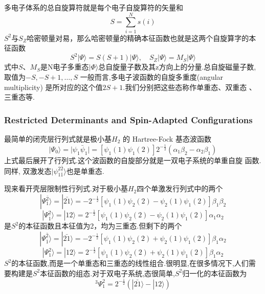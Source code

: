 \documentclass[fontset=none,12pt,a4paper]{ctexart}
\numberwithin{equation}{section}
\begin{document}
多电子体系的总自旋算符就是每个电子自旋算符的矢量和
\begin{equation}
  S=\sum_{i=1}^N s(i)
\end{equation}
$S^2$与$S_Z$哈密顿量对易，那么哈密顿量的精确本征函数也就是这两个自旋算字的本征函数
\begin{equation}
  S^2|\Psi\rangle=S(S+1)|\Psi\rangle
  ,\quad S_Z|\Psi\rangle=M_S|\Psi\rangle
\end{equation}
式中$S$、$M_S$是N电子多重态$|\Phi\rangle$总自旋量子数及其z方向上的分量.总自旋磁量子数,取值为$-S,-S+1,\dots,S$
一般而言,多电子波函数的自旋多重度(angular multiplicity) 是所对应的这个值$2S+1$.我们分别把这些态称作单重态、双重态
、三重态等.
\subsubsection{Restricted Determinants and Spin-Adapted Configurations}
最简单的闭壳层行列式就是极小基$H_2$ 的 Hartree-Fock 基态波函数
\begin{equation}
  |\Psi_0\rangle=|\psi_1\bar{\psi}_1|=[\psi_1(1)\psi_1(2)]2^{-\frac{1}{2}}(\alpha_1\beta_2-\alpha_2\beta_1)
\end{equation}
上式最后展开了行列式.这个波函数的自旋部分就是一双电子系统的单重自旋 函数. 同样, 双激发态$|\psi_{1\bar{1}}^{2\bar{2}}\rangle$也是单重态.

现来看开壳层限制性行列式.对于极小基$H_2$四个单激发行列式中的两个
\begin{equation}
  | \Psi_{1}^{\bar{2}} \rangle
  =|\bar{21}\rangle=-2^{-\frac{1}{2}}[\psi_1(1)\psi_2(2)-\psi_2(1)\psi_1(2)]\beta_1\beta_2
\end{equation}
\begin{equation}
  | \Psi_{\bar{1}}^{2} \rangle
  =|12\rangle=2^{-\frac{1}{2}}[\psi_1(1)\psi_2(2)-\psi_2(1)\psi_1(2)]\alpha_1\alpha_2
\end{equation}
是$S^2$的本征函数且本征值为2，均为三重态.但剩下的两个
\begin{equation}
  | \Psi_{\bar{1}}^{\bar{2}} \rangle
  =|\bar{21}\rangle=-2^{-\frac{1}{2}}[\psi_1(1)\psi_2(2)+\psi_2(1)\psi_1(2)]\beta_1\alpha_2
\end{equation}
\begin{equation}
  | \Psi_1^{2} \rangle
  =|12\rangle=2^{-\frac{1}{2}}[\psi_1(1)\psi_2(2)+\psi_2(1)\psi_1(2)]\beta_1\alpha_2
\end{equation}$S^2$的本征函数,而是一个单重态和三重态的线性组合.很明显,在很多情况下,人们需要构建是$S^2$本征函数的组态.对于双电子系统,态很简单,$S^2$归一化的本征函数为
\begin{equation}
  {}^{3}\Psi_1^{2}=2^{-\frac{1}{2}}(|\bar{21}\rangle-|12\rangle)
\end{equation}
\end{document}
